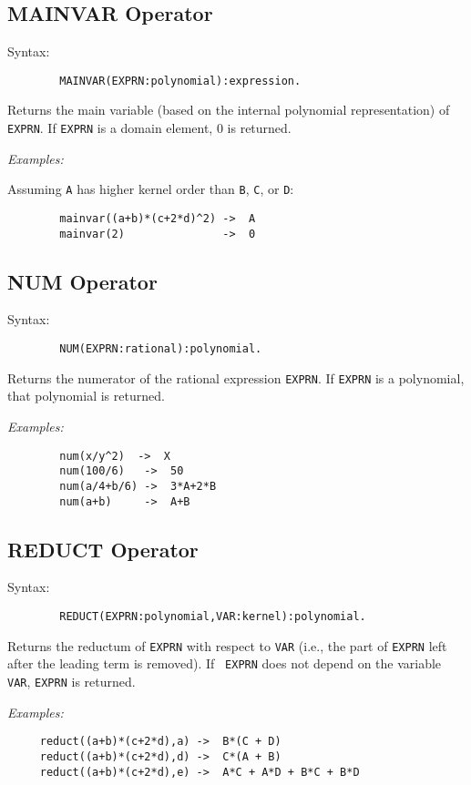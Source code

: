 \subsection{MAINVAR Operator}

Syntax:
\begin{verbatim}
        MAINVAR(EXPRN:polynomial):expression.
\end{verbatim}
Returns the main variable (based on the internal polynomial representation)
of {\tt EXPRN}. If {\tt EXPRN} is a domain element, 0 is returned.

{\it Examples:}

Assuming {\tt A} has higher kernel order than {\tt B}, {\tt C}, or {\tt D}:
\begin{verbatim}
        mainvar((a+b)*(c+2*d)^2) ->  A
        mainvar(2)               ->  0
\end{verbatim}

\subsection{NUM Operator}

Syntax:
\begin{verbatim}
        NUM(EXPRN:rational):polynomial.
\end{verbatim}
Returns the numerator of the rational expression {\tt EXPRN}.  If {\tt EXPRN}
is a polynomial, that polynomial is returned.

{\it Examples:}
\begin{verbatim}
        num(x/y^2)  ->  X
        num(100/6)   ->  50
        num(a/4+b/6) ->  3*A+2*B
        num(a+b)     ->  A+B
\end{verbatim}

\subsection{REDUCT Operator}

Syntax:
\begin{verbatim}
        REDUCT(EXPRN:polynomial,VAR:kernel):polynomial.
\end{verbatim}
Returns the reductum of {\tt EXPRN} with respect to {\tt VAR} (i.e., the
part of {\tt EXPRN} left after the leading term is removed).  If {\tt
EXPRN} does not depend on the variable {\tt VAR}, {\tt EXPRN} is returned.

{\it Examples:}
\begin{verbatim}
     reduct((a+b)*(c+2*d),a) ->  B*(C + D)
     reduct((a+b)*(c+2*d),d) ->  C*(A + B)
     reduct((a+b)*(c+2*d),e) ->  A*C + A*D + B*C + B*D
\end{verbatim}

